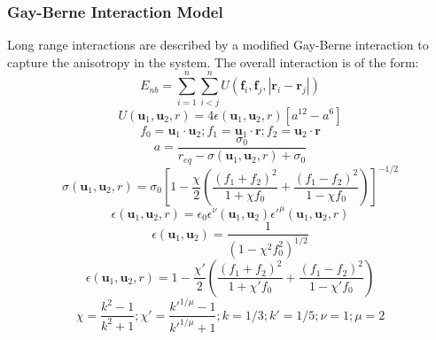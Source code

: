 \documentclass[11pt]{article}
\begin{document}
\subsubsection*{Gay-Berne Interaction Model}
Long range interactions are described by a modified Gay-Berne interaction to capture the anisotropy in the system. The overall interaction is of the form:
\begin{equation*}
E_{nb} = \sum_{i=1}^n \sum_{i < j}^n U(\textbf{f}_i,\textbf{f}_j, \left| \textbf{r}_i - \textbf{r}_j \right|)
\end{equation*}
\begin{equation*}
U(\textbf{u}_1,\textbf{u}_2,r) = 4\epsilon(\textbf{u}_1,\textbf{u}_2,r) \left[ a^{12} - a^6\right]
\end{equation*}
\begin{equation*}
f_0 = \textbf{u}_1 \cdot \textbf{u}_2 ; f_1 = \textbf{u}_1 \cdot \textbf{r} ; f_2 = \textbf{u}_2 \cdot \textbf{r}
\end{equation*}
\begin{equation*}
a = \frac{\sigma_0}{r_{eq}-\sigma(\textbf{u}_1,\textbf{u}_2,r)+\sigma_0}
\end{equation*}
\begin{equation*}
\sigma(\textbf{u}_1,\textbf{u}_2,r) = \sigma_0 \left[ 1 - \frac{\chi}{2} \left( \frac{\left( f_1+f_2\right)^2}{1+\chi f_0} + \frac{\left( f_1-f_2\right)^2}{1-\chi f_0} \right) \right]^{-1/2}
\end{equation*}
\begin{equation*} 
\epsilon(\textbf{u}_1,\textbf{u}_2,r) = \epsilon_0 \epsilon^{\nu}(\textbf{u}_1,\textbf{u}_2)\epsilon'^{\mu}(\textbf{u}_1,\textbf{u}_2,r) 
\end{equation*}
\begin{equation*}
\epsilon(\textbf{u}_1, \textbf{u}_2) = \frac{1}{\left( 1-\chi^2 f_0^2 \right)^{1/2}}
\end{equation*}
\begin{equation*}
\epsilon(\textbf{u}_1,\textbf{u}_2,r) =  1 - \frac{\chi'}{2} \left( \frac{\left( f_1+f_2\right)^2}{1+\chi' f_0} + \frac{\left( f_1-f_2\right)^2}{1-\chi' f_0} \right) 
\end{equation*}
\begin{equation*}
\chi = \frac{k^2-1}{k^2+1}; \chi' = \frac{k'^{1/\mu} - 1}{k'^{1/\mu} + 1}; k = 1/3; k' = 1/5; \nu = 1; \mu = 2 
\end{equation*}
\end{document}
